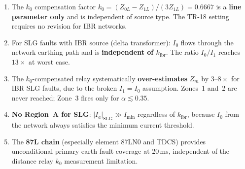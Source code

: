 \documentclass[11pt,a4paper]{article}
\begin{document}
\begin{enumerate}
  \item The $k_0$ compensation factor $k_0 = (Z_{0L}-Z_{1L})/(3Z_{1L}) = 0.6667$
        is a \textbf{line parameter only} and is independent of source type.
        The TR-18 setting requires no revision for IBR networks.
  \item For SLG faults with IBR source (delta transformer): $I_0$ flows through
        the network earthing path and is \textbf{independent of $k_\mathrm{ibr}$}.
        The ratio $I_0/I_1$ reaches $13\times$ at worst case.
  \item The $k_0$-compensated relay systematically \textbf{over-estimates}
        $Z_m$ by $3$--$8\times$ for IBR SLG faults, due to the broken
        $I_1=I_0$ assumption.  Zones~1 and~2 are never reached; Zone~3 fires
        only for $\alpha\lesssim 0.35$.
  \item \textbf{No Region~A for SLG}: $|I_a|_\mathrm{SLG}\gg I_\mathrm{min}$
        regardless of $k_\mathrm{ibr}$, because $I_0$ from the network always
        satisfies the minimum current threshold.
  \item The \textbf{87L chain} (especially element 87LN0 and TDCS) provides
        unconditional primary earth-fault coverage at 20\,ms, independent of
        the distance relay $k_0$ measurement limitation.
\end{enumerate}



\end{document}
